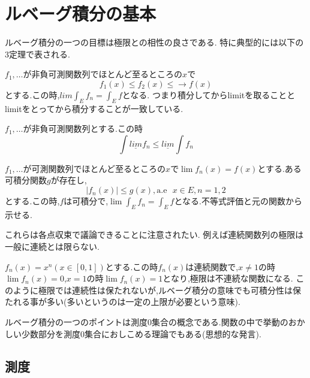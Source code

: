 \chapter{ルベーグ積分の基本}
ルベーグ積分の一つの目標は極限との相性の良さである.
特に典型的には以下の3定理で表される.

\begin{thm}[単調収束定理]
  $f_1, \ldots$が非負可測関数列でほとんど至るところの$x$で
  \begin{equation*}
   f_1(x) \le f_2(x) \le   \to f(x)
  \end{equation*}
とする.この時,$lim \int_E f_n = \int_E f$となる.
つまり積分してからlimitを取ることとlimitをとってから積分することが一致している.
\end{thm}

\begin{thm}[ファトゥの補題]
  $f_1, \ldots$が非負可測関数列とする.この時
  \begin{equation*}
   \int \underline{lim} f_n \le  \underline{lim} \int f_n
  \end{equation*}
\end{thm}

\begin{thm}[ルベーグの収束定理]
  $f_1, \ldots$が可測関数列でほとんど至るところの$x$で$\lim f_n(x)=f(x)$とする.ある可積分関数$g$が存在し,
  \begin{equation*}
   |f_n(x)| \le g(x), \mathrm{a.e} \mbox{ } x\in E, n=1,2
  \end{equation*}
  とする.この時,$f$は可積分で,$\lim \int_E f_n = \int_E f$となる.不等式評価と元の関数から示せる.
\end{thm}

これらは各点収束で議論できることに注意されたい.
例えば連続関数列の極限は一般に連続とは限らない.
\begin{epl}
  $f_n(x) = x^n (x \in [0, 1])$とする.この時$f_n(x)$は連続関数で,$x \neq 1$の時$\lim f_n(x) = 0$,$x =1$の時$\lim f_n(x) = 1$となり,極限は不連続な関数になる.
  このように極限では連続性は保たれないが,ルベーグ積分の意味でも可積分性は保たれる事が多い(多いというのは一定の上限が必要という意味).
\end{epl}

ルベーグ積分の一つのポイントは測度0集合の概念である.関数の中で挙動のおかしい少数部分を測度0集合におしこめる理論でもある(思想的な発言).

\section{測度}

